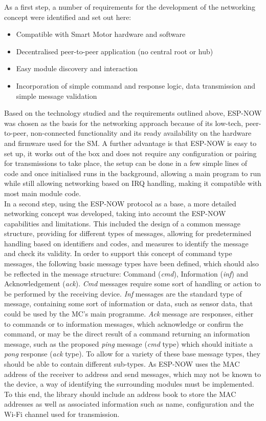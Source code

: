 As a first step, a number of requirements for the development of the networking concept were identified and set out here:
\begin{itemize}
    \item Compatible with Smart Motor hardware and software
    \item Decentralised peer-to-peer application (no central root or hub)
    \item Easy module discovery and interaction
    \item Incorporation of simple command and response logic, data transmission and simple message validation
\end{itemize}

Based on the technology studied and the requirements outlined above, ESP-NOW was chosen as the basis for the networking approach because of its low-tech, peer-to-peer, non-connected functionality and its ready availability on the hardware and firmware used for the SM. A further advantage is that ESP-NOW is easy to set up, it works out of the box and does not require any configuration or pairing for transmissions to take place, the setup can be done in a few simple lines of code and once initialised runs in the background, allowing a main program to run while still allowing networking based on IRQ handling, making it compatible with most main module code.\\

In a second step, using the ESP-NOW protocol as a base, a more detailed networking concept was developed, taking into account the ESP-NOW capabilities and limitations. This included the design of a common message structure, providing for different types of messages, allowing for predetermined handling based on identifiers and codes, and measures to identify the message and check its validity. In order to support this concept of command type messages, the following basic message types have been defined, which should also be reflected in the message structure: Command (\textit{cmd}), Information (\textit{inf}) and Acknowledgement (\textit{ack}).
\textit{Cmd} messages require some sort of handling or action to be performed by the receiving device. 
\textit{Inf} messages are the standard type of message, containing some sort of information or data, such as sensor data, that could be used by the MC's main programme. \textit{Ack} message are responses, either to commands or to information messages, which acknowledge or confirm the command, or may be the direct result of a command returning an information message, such as the proposed \textit{ping} message (\textit{cmd} type) which should initiate a \textit{pong} response (\textit{ack} type). To allow for a variety of these base message types, they should be able to contain different sub-types.
As ESP-NOW uses the MAC address of the receiver to address and send messages, which may not be known to the device, a way of identifying the surrounding modules must be implemented. To this end, the library should include an address book to store the MAC addresses as well as associated information such as name, configuration and the Wi-Fi channel used for transmission. \\

